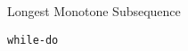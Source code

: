 \begin{frame}{}
  \centerline{\Large Longest Monotone Subsequence}

  \vspace{0.80cm}
  \centerline{\LARGE \texttt{while-do}}
\end{frame}

